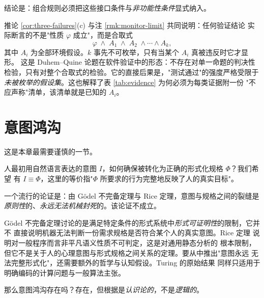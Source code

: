 结论是：组合规则必须把这些接口条件与\emph{非功能性条件}显式纳入。

\begin{remark}[保证的整体论性质]\label{rmk:duhem}
推论 \ref{cor:three-failures}(c) 与注 \ref{rmk:monitor-limit} 共同说明：任何验证结论
实际断言的不是"性质 $\varphi$ 成立"，而是合取式
\[
\varphi \;\land\; A_1 \;\land\; A_2 \;\land \cdots \land A_k,
\]
其中 $A_i$ 为全部环境假设。$k$ 事先不可枚举，只有当某个 $A_i$ 真被违反时它才显形。
这是 Duhem--Quine 论题\cite{quine1951}在软件验证中的形态：不存在对单一命题的判决性
检验，只有对整个合取式的检验。它的直接后果是，"测试通过"的强度严格受限于
\emph{未被枚举的假设集}。这也解释了表 \ref{tab:evidence} 为何必须为每类证据附一份
"不应声称"清单，该清单就是已知的 $A_i$。
\end{remark}

\section{意图鸿沟}\label{sec:intent-gap}

这是本章最需要谨慎的一节。

\begin{problem}[意图鸿沟]
人最初用自然语言表达的意图 $I$，如何确保被转化为正确的形式化规格 $\Phi$？我们希望
有 $I \equiv \Phi$，这里的等价指"$\Phi$ 所要求的行为完整地反映了人的真实目标"。
\end{problem}

一个流行的论证是：由 Gödel 不完备定理与 Rice 定理，意图与规格之间的裂缝是
\emph{原则性}的、\emph{永远无法机械封死}的。该论证不成立。

\begin{proposition}[本文不接受该论证的理由]\label{prop:no-godel}
Gödel 不完备定理讨论的是满足特定条件的形式系统中\emph{形式可证明性}的限制，它并不
直接说明机器无法判断一份需求规格是否符合某个人的真实意图。Rice 定理
\cite{rice1953}说明对一般程序而言非平凡语义性质不可判定，这是对通用静态分析的
根本限制，但它不是关于人的心理意图与形式规格之间关系的定理。要从中推出"意图永远
无法完整形式化"，还需要额外的哲学与认知假设。Turing 的原始结果\cite{turing1936}
同样只适用于明确编码的计算问题与一般算法主张。
\end{proposition}

那么意图鸿沟存在吗？存在，但根据是\emph{认识论的}，不是\emph{逻辑的}。

